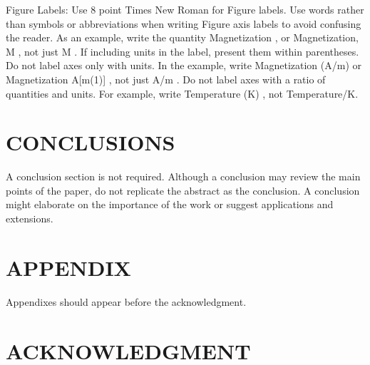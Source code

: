 \documentclass[letterpaper, 10 pt, conference]{ieeeconf}  %
\begin{document}
Figure Labels: Use 8 point Times New Roman for Figure labels. Use words rather than symbols or abbreviations when writing Figure axis labels to avoid confusing the reader. As an example, write the quantity  Magnetization , or  Magnetization, M , not just  M . If including units in the label, present them within parentheses. Do not label axes only with units. In the example, write  Magnetization (A/m)  or  Magnetization {A[m(1)]} , not just  A/m . Do not label axes with a ratio of quantities and units. For example, write  Temperature (K) , not  Temperature/K. 

\section{CONCLUSIONS}

A conclusion section is not required. Although a conclusion may review the main points of the paper, do not replicate the abstract as the conclusion. A conclusion might elaborate on the importance of the work or suggest applications and extensions. 

\addtolength{\textheight}{-12cm}   %







\section*{APPENDIX}

Appendixes should appear before the acknowledgment.

\section*{ACKNOWLEDGMENT}
\end{document}
